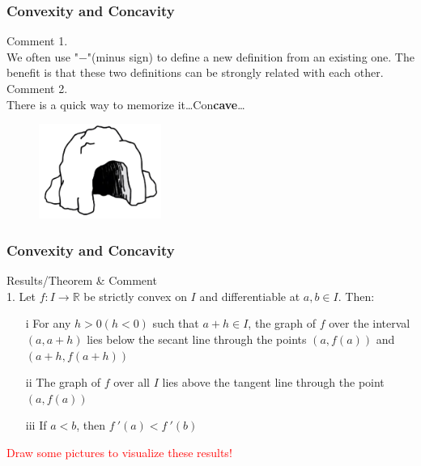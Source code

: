 \documentclass{beamer}
\begin{document}
\begin{frame}
    \frametitle{Convexity and Concavity}
Comment 1. \\
\vspace{0.5em}
\hspace{1em}
We often use "$-$"(minus sign) to define a new definition from an existing one. The benefit is that these two definitions can 
be strongly related with each other.\\
\vspace{1em}\pause
Comment 2.\\
\hspace{1em}
There is a quick way to memorize it\dots\hspace{2em}Con\textbf{cave}\dots
\begin{figure}[H]
    \centering
    \includegraphics[width=4cm]{Concave.png}
\end{figure}

\end{frame}

\begin{frame}
    \frametitle{Convexity and Concavity}
Results/Theorem \& Comment\\
\vspace{1em}
1. Let $f:I\rightarrow\mathbb{R}$ be strictly convex on $I$ and differentiable at $a,b\in I$. Then:
\begin{enumerate}
    \item[i] For any $h>0(h<0)$ such that $a+h\in I$, the graph of $f$ over the interval $(a,a+h)$ lies below the secant line through the 
        points $(a,f(a))$ and $(a+h, f(a+h))$
    \item[ii] The graph of $f$ over all $I$ lies above the tangent line through the point $(a, f(a))$
    \item[iii] If $a<b$, then $f~'(a)<f~'(b)$
\end{enumerate}
\vspace{1em}
\textcolor{red}{Draw some pictures to visualize these results!}
\end{frame}
\end{document}
